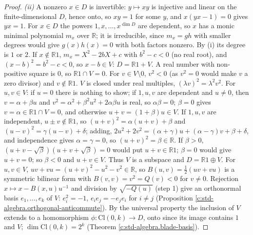 \documentclass[11pt]{article}
\theoremstyle{definition}
\theoremstyle{plain}
\providecommand{\Cl}{}\renewcommand{\Cl}{\mathrm{Cl}}
\providecommand{\R}{}\renewcommand{\R}{\mathbb{R}}
\begin{document}
\begin{proof}
\emph{(ii)} A nonzero $x \in D$ is invertible: $y \mapsto xy$ is injective and linear on the finite-dimensional $D$, hence onto, so $xy = 1$ for some $y$, and $x(yx - 1) = 0$ gives $yx = 1$. For $x \in D$ the powers $1, x, \dots, x^{\dim D}$ are dependent, so $x$ has a monic minimal polynomial $m_{x}$ over $\R$; it is irreducible, since $m_{x} = gh$ with smaller degrees would give $g(x)h(x) = 0$ with both factors nonzero. By (i) its degree is $1$ or $2$. If $x \notin \R 1$, $m_{x} = X^{2} - 2bX + c$ with $b^{2} - c < 0$ (no real root), and $(x - b)^{2} = b^{2} - c < 0$, so $x - b \in V$: $D = \R 1 + V$. A real number with non-positive square is $0$, so $\R 1 \cap V = 0$. For $v \in V \setminus 0$, $v^{2} < 0$ (as $v^{2} = 0$ would make $v$ a zero divisor) and $v \notin \R 1$. $V$ is closed under real multiples, $(\lambda v)^{2} = \lambda^{2}v^{2}$. For $u, v \in V$: if $u = 0$ there is nothing to show; if $1, u, v$ are dependent and $u \ne 0$, then $v = \alpha + \beta u$ and $v^{2} = \alpha^{2} + \beta^{2}u^{2} + 2\alpha\beta u$ is real, so $\alpha\beta = 0$; $\beta = 0$ gives $v = \alpha \in \R 1 \cap V = 0$, and otherwise $u + v = (1 + \beta)u \in V$. If $1, u, v$ are independent, $u \pm v \notin \R 1$, so $(u + v)^{2} = \alpha(u + v) + \beta$ and $(u - v)^{2} = \gamma(u - v) + \delta$; adding, $2u^{2} + 2v^{2} = (\alpha + \gamma)u + (\alpha - \gamma)v + \beta + \delta$, and independence gives $\alpha = \gamma = 0$, so $(u + v)^{2} = \beta \in \R$. If $\beta > 0$, $(u + v - \sqrt{\beta})(u + v + \sqrt{\beta}) = 0$ would put $u + v \in \R 1$; $\beta = 0$ would give $u + v = 0$; so $\beta < 0$ and $u + v \in V$. Thus $V$ is a subspace and $D = \R 1 \oplus V$. For $u, v \in V$, $uv + vu = (u + v)^{2} - u^{2} - v^{2} \in \R$, so $B(u, v) = \tfrac12(uv + vu)$ is a symmetric bilinear form with $B(v, v) = v^{2} = Q(v) < 0$ for $v \ne 0$. Rejection $x \mapsto x - B(x, u)u^{-1}$ and division by $\sqrt{-Q(u)}$ (step 1) give an orthonormal basis $e_{1}, \dots, e_{k}$ of $V$: $e_{i}^{2} = -1$, $e_{i}e_{j} = -e_{j}e_{i}$ for $i \ne j$ (Proposition \ref{c:std-algebra.orthogonal-anticommute}). By the universal property the inclusion of $V$ extends to a homomorphism $\phi: \Cl(0,k) \to D$, onto since its image contains $1$ and $V$; $\dim \Cl(0,k) = 2^{k}$ (Theorem \ref{c:std-algebra.blade-basis}).


\end{proof}
\end{document}
